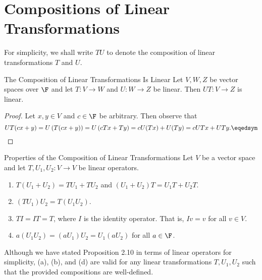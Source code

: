 \documentclass[linearalgebraI]{subfiles}
\begin{document}
    \section{Compositions of Linear Transformations}

    \begin{remark}
        For simplicity, we shall write $TU$ to denote the composition of linear transformations $T$ and $U$.
    \end{remark}

    \clearpage
    \begin{prop}{The Composition of Linear Transformations Is Linear}
        Let $V, W, Z$ be vector spaces over $\F$ and let $T: V\to W$ and $U: W\to Z$ be linear. Then $UT: V\to Z$ is linear.
    \end{prop}

    \begin{proof}
        Let $x,y\in V$ and $c\in \F$ be arbitrary. Then observe that
        \begin{equation*}
            UT(cx+y) = U \left( T(cx+y) \right) = U \left( cTx + Ty \right) = cU(Tx) + U(Ty) = cUTx + UTy. \eqedsym
        \end{equation*}
    \end{proof}

    \begin{prop}{Properties of the Composition of Linear Transformations}
        Let $V$ be a vector space and let $T, U_1, U_2:V\to V$ be linear operators.
        \begin{enumerate}
            \item $T\left( U_1+U_2 \right)  = TU_1 + TU_2$ and $(U_1+U_2)T = U_1T + U_2T$.
            \item $(TU_1)U_2 = T(U_1U_2)$.
            \item $TI = IT = T$, where $I$ is the identity operator. That is, $Iv = v$ for all $v\in V$.
            \item $a(U_1U_2) = (aU_1)U_2 = U_1(aU_2)$ for all $a\in \F$.
        \end{enumerate}
    \end{prop}

    \begin{remark}
        Although we have stated Proposition 2.10 in terms of linear operators for simplicity, (a), (b), and (d) are valid for any linear transformations $T, U_1, U_2$ such that the provided compositions are well-defined.
    \end{remark}
\end{document}
